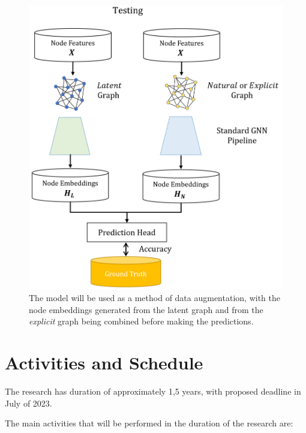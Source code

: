 \documentclass[12pt,a4paper]{article}
\begin{document}
	\begin{figure}[hbtp]
		\centering \includegraphics[scale=0.4]{eval_part3_2.png}
		\caption{The model will be used as a method of data augmentation, with the node embeddings generated from the latent graph and from the \emph{explicit} graph being combined before making the predictions. \label{eval3_2}}
	\end{figure}

	\section{Activities and Schedule}
	\label{sec:Activities_and_schedule}

	The research has duration of approximately 1,5 years, with proposed deadline in July of 2023.

	The main activities that will be performed in the duration of the research are:
\end{document}
